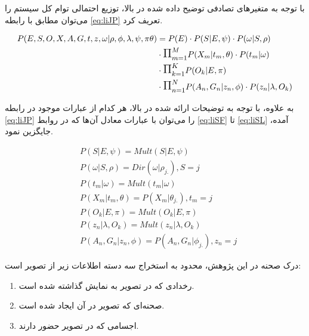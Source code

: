 \begin{enumerate}
	با توجه به متغیرهای تصادفی توضیح داده شده در بالا، توزیع احتمالی توام کل سیستم را می‌توان مطابق با رابطه 
	\ref{eq:liJP}
	تعریف کرد.
	
	\begin{equation}
	\label{eq:liJP}\begin{split}
	P(E,S,O,X,A,G,t,z,\omega |\rho ,\phi ,\lambda ,\psi ,\pi \theta) &= P(E)\cdot P(S|E,\psi)\cdot P(\omega|S,\rho) \\ 
	&\cdot \mathlarger{\mathlarger{\Pi}}_{m=1}^M P(X_m|t_m,\theta)\cdot P(t_m|\omega) \\
	&\cdot \mathlarger{\mathlarger{\Pi}}_{k=1}^K P(O_k|E,\pi)\\
	&\cdot \mathlarger{\mathlarger{\Pi}}_{n=1}^N P(A_n,G_n|z_n,\phi)\cdot P(z_n|\lambda,O_k)
	\end{split}
	\end{equation}
	
	به علاوه، با توجه به توضیحات ارائه شده در بالا، هر کدام از عبارات موجود در رابطه \ref{eq:liJP} را می‌توان با عبارات معادل آن‌ها که در روابط
	\ref{eq:liSF}
	تا
	\ref{eq:liSL}
	آمده، جایگزین نمود.
	
	\begin{align}
	&P(S|E,\psi) = Mult(S|E,\psi)
	\label{eq:liSF}
	\\
	&P(\omega|S,\rho) = Dir(\omega|\rho_{j.}), S = j
	\\
	&P(t_m|\omega) = Mult(t_m|\omega)
	\\
	&P(X_m|t_m,\theta) = P(X_m|\theta_{j.}), t_m = j
	\\
	&P(O_k|E,\pi) = Mult(O_k|E,\pi)
	\\
	&P(z_n|\lambda,O_k) = Mult(z_n|\lambda,O_k)
	\\
	&P(A_n,G_n|z_n,\phi) = P(A_n,G_n|\phi_{j.}), z_n = j
	\label{eq:liSL}
	\end{align}
	
	درک صحنه در این پژوهش، محدود به استخراج سه دسته اطلاعات زیر از تصویر است:
	
	\begin{enumerate}
		\item رخدادی که در تصویر به نمایش گذاشته شده است.
		\item صحنه‌ای که تصویر در آن ایجاد شده است.
		\item اجسامی که در تصویر حضور دارند.
	\end{enumerate}
	

\end{enumerate}

